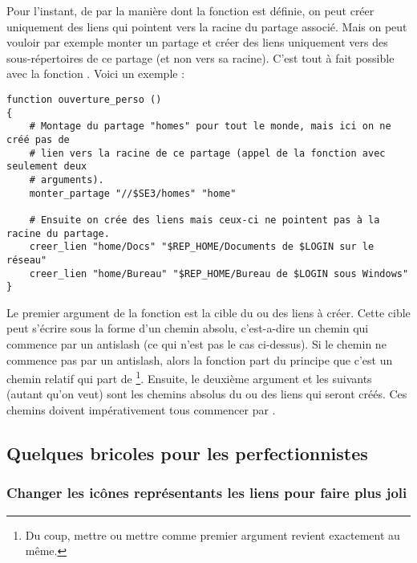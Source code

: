 Pour l'instant, de par la manière dont la fonction
 est définie, on peut créer uniquement
des liens qui pointent vers la racine du partage associé. Mais on
peut vouloir  par exemple monter un partage et créer des liens uniquement
vers des sous-répertoires de ce partage (et non vers sa racine). C'est tout
à fait possible avec la fonction . Voici un exemple :
%
\begin{lstlisting}[emph={ENTREE},emphstyle={\return}]
function ouverture_perso ()
{
    # Montage du partage "homes" pour tout le monde, mais ici on ne créé pas de
    # lien vers la racine de ce partage (appel de la fonction avec seulement deux
    # arguments).
    monter_partage "//$SE3/homes" "home"
    
    # Ensuite on crée des liens mais ceux-ci ne pointent pas à la racine du partage.
    creer_lien "home/Docs" "$REP_HOME/Documents de $LOGIN sur le réseau"
    creer_lien "home/Bureau" "$REP_HOME/Bureau de $LOGIN sous Windows"
}
\end{lstlisting}
%
Le premier argument de la fonction  est la cible
du ou des liens à créer. Cette cible peut s'écrire sous la forme
d'un chemin absolu, c'est-a-dire un chemin qui commence par un antislash (ce qui
n'est pas le cas ci-dessus). Si le chemin ne commence pas par un antislash,
alors la fonction part du principe que c'est un chemin relatif qui part
de %
%
\footnote{Du coup, mettre  ou mettre
 comme premier argument
revient exactement au même.}.
%
Ensuite, le deuxième argument et les
suivants (autant qu'on veut) sont les chemins absolus du ou des
liens qui seront
créés. Ces chemins doivent impérativement tous commencer par
.







\subsection{Quelques bricoles pour les perfectionnistes}







\subsubsection{Changer les icônes représentants les liens pour faire plus joli}
\label{changer-icone}

